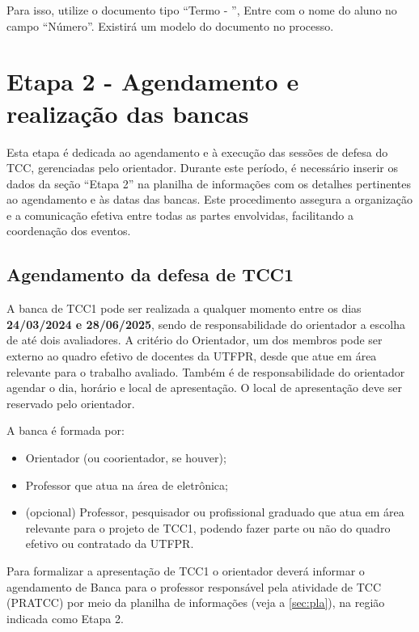 \documentclass[a4paper, 12pt]{article}
\newcommand{\startdate}{24/03/2024}		%
\newcommand{\bancadate}{28/06/2025}		%
\begin{document}
	Para isso, utilize o documento tipo ``Termo - '', Entre com o nome do aluno no campo ``Número''. Existirá um modelo do documento no processo.


    \section{Etapa 2 - Agendamento e realização das bancas}
	\label{sec:et2}

	Esta etapa é dedicada ao agendamento e à execução das sessões de defesa do TCC, gerenciadas pelo orientador. Durante este período, é necessário inserir os dados da seção ``Etapa 2'' na planilha de informações com os detalhes pertinentes ao agendamento e às datas das bancas. Este procedimento assegura a organização e a comunicação efetiva entre todas as partes envolvidas, facilitando a coordenação dos eventos.
   	
	\subsection{Agendamento da defesa de TCC1}

    A banca de TCC1 pode ser realizada a qualquer momento entre os dias \textbf{\startdate{} e \bancadate{}}, sendo de responsabilidade do orientador a escolha de até dois avaliadores. A critério do Orientador, um dos membros pode ser externo ao quadro efetivo de docentes da UTFPR, desde que atue em área relevante para o trabalho avaliado. Também é de responsabilidade do orientador agendar o dia, horário e local de apresentação. O local de apresentação deve ser reservado pelo orientador.

	A banca é formada por:

	\begin{itemize}
		\item Orientador (ou coorientador, se houver);
		\item Professor que atua na área de eletrônica;
		\item (opcional) Professor, pesquisador ou profissional graduado que atua em área relevante para o projeto de TCC1,  podendo fazer parte ou não do quadro efetivo ou contratado da UTFPR.
	\end{itemize}
    
    Para formalizar a apresentação de TCC1 o orientador deverá informar o agendamento de Banca para o professor responsável pela atividade de TCC (PRATCC) por meio da planilha de informações (veja a \autoref{sec:pla}), na região indicada como Etapa 2.
    
\end{document}
